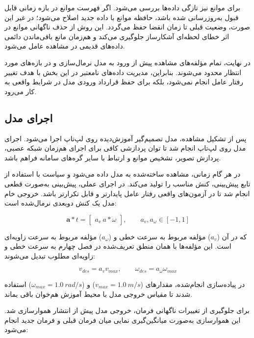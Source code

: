 برای موانع نیز تازگی داده‌ها بررسی می‌شود. اگر فهرست موانع در بازه زمانی قابل قبول به‌روزرسانی شده باشد، حافظه موانع با داده جدید اصلاح می‌شود؛ در غیر این صورت، وضعیت قبلی تا زمان انقضا حفظ می‌گردد. این روش از حذف ناگهانی موانع در اثر خطای لحظه‌ای آشکارساز جلوگیری می‌کند و هم‌زمان مانع باقی‌ماندن دائمی داده‌های قدیمی در مشاهده عامل می‌شود.

در نهایت، تمام مؤلفه‌های مشاهده پیش از ورود به مدل نرمال‌سازی و در بازه‌های مورد انتظار محدود می‌شوند. بنابراین، مدیریت داده‌های نامعتبر در این بخش با هدف تغییر رفتار عامل انجام نمی‌شود، بلکه برای حفظ قرارداد ورودی مدل در شرایط واقعی به کار می‌رود.

\subsection{اجرای مدل }
\label{subsec:real_lstm_sac_execution}

پس از تشکیل مشاهده، مدل تصمیم‌گیر آموزش‌دیده روی لپ‌تاپ اجرا می‌شود. اجرای مدل روی لپ‌تاپ انجام شد تا توان پردازشی کافی برای اجرای هم‌زمان شبکه عصبی، پردازش تصویر، تشخیص موانع و ارتباط با سایر گره‌های سامانه فراهم باشد.

در هر گام زمانی، مشاهده ساخته‌شده به مدل داده می‌شود و سیاست با استفاده از تابع پیش‌بینی، کنش مناسب را تولید می‌کند. در اجرای عملی، پیش‌بینی به‌صورت قطعی انجام شد تا در آزمون‌های واقعی رفتار عامل پایدارتر و قابل تکرارتر باشد. خروجی خام مدل یک کنش دوبعدی نرمال‌شده است:

\begin{equation}
	\mathbf{a}*t =
	\begin{bmatrix}
		a_v \
		a*\omega
	\end{bmatrix},
	\qquad
	a_v,a_\omega \in [-1,1]
	\label{eq:real_policy_action}
\end{equation}

که در آن ($a_v$) مؤلفه مربوط به سرعت خطی و ($a_\omega$) مؤلفه مربوط به سرعت زاویه‌ای است. این مؤلفه‌ها با همان منطق تعریف‌شده در فصل چهارم به سرعت خطی و زاویه‌ای مطلوب تبدیل می‌شوند:

\begin{equation}
	v_{des} = a_v v_{max},
	\qquad
	\omega_{des} = a_\omega \omega_{max}
	\label{eq:real_action_scaling}
\end{equation}

در پیاده‌سازی انجام‌شده، مقدارهای ($v_{max}=1.0~m/s$) و ($\omega_{max}=1.0~rad/s$) استفاده شدند تا مقیاس خروجی مدل با محیط آموزش هم‌خوان باقی بماند.

برای جلوگیری از تغییرات ناگهانی فرمان، خروجی مدل پیش از انتشار هموارسازی شد. این هموارسازی به‌صورت میانگین‌گیری نمایی میان فرمان قبلی و فرمان جدید انجام می‌شود:

